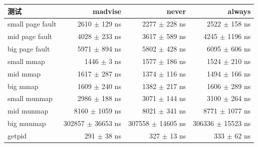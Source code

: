 \begin{tabular}{@{}lrrr@{}}
\toprule
测试 & madvise & never & always \\
\midrule
small page fault & 2610 $\pm$ 129 ns & 2277 $\pm$ 228 ns & 2522 $\pm$ 158 ns \\
mid page fault & 4028 $\pm$ 233 ns & 3617 $\pm$ 589 ns & 4245 $\pm$ 1196 ns \\
big page fault & 5971 $\pm$ 894 ns & 5802 $\pm$ 428 ns & 6095 $\pm$ 606 ns \\
small mmap & 1446 $\pm$ 3 ns & 1577 $\pm$ 186 ns & 1524 $\pm$ 210 ns \\
mid mmap & 1617 $\pm$ 287 ns & 1374 $\pm$ 116 ns & 1494 $\pm$ 166 ns \\
big mmap & 1609 $\pm$ 240 ns & 1382 $\pm$ 217 ns & 1606 $\pm$ 289 ns \\
small munmap & 2986 $\pm$ 188 ns & 3071 $\pm$ 144 ns & 3100 $\pm$ 264 ns \\
mid munmap & 8160 $\pm$ 1059 ns & 8021 $\pm$ 341 ns & 8771 $\pm$ 1077 ns \\
big munmap & 302857 $\pm$ 36653 ns & 307558 $\pm$ 14605 ns & 306336 $\pm$ 15523 ns \\
getpid & 291 $\pm$ 38 ns & 327 $\pm$ 13 ns & 333 $\pm$ 62 ns \\
\bottomrule
\end{tabular}
